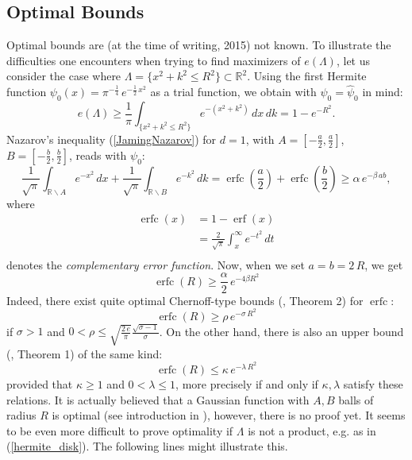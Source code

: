\documentclass[12pt,a4paper]{article}
\newcommand{\RR}[1]{\mathbb{R}^#1}
\begin{document}
\subsection{Optimal Bounds}
Optimal bounds are (at the time of writing, 2015) not known. To illustrate the
difficulties one encounters when trying to find maximizers of $e(\Lambda)$, let us
consider the case where $\Lambda=\{x^2+k^2\leq R^2\}\subset\RR{2}$. Using the first
Hermite function $\psi_0(x)=\pi^{-\frac{1}{4}}\,e^{-\frac{1}{2}\,x^2}$ as a trial
function, we obtain with $\psi_0=\hat\psi_0$ in mind:
\begin{equation}\label{hermite_disk}
   e(\Lambda) \geq \frac{1}{\pi}\int_{\{x^2+k^2\leq R^2\}} e^{-(x^2+k^2)}\, dx\,dk
   = 1-e^{-R^2}.
\end{equation}
Nazarov's inequality (\ref{JamingNazarov}) for $d=1$, with 
$A=[-\frac{a}{2},\frac{a}{2}]$, $B=[-\frac{b}{2},\frac{b}{2}]$, reads with $\psi_0$:
\begin{equation*}
    \frac{1}{\sqrt{\pi}} \int_{\mathbb{R}\backslash A} e^{-x^2}\,dx +
    \frac{1}{\sqrt{\pi}} \int_{\mathbb{R}\backslash B} e^{-k^2}\,dk =
    \operatorname{erfc}({\frac{a}{2}})+\operatorname{erfc}({\frac{b}{2}})
    \geq \alpha\,e^{-\beta\, a b},
\end{equation*}
where 
\begin{align*}
    \operatorname{erfc}(x) & = 1-\operatorname{erf}(x) \\[5pt]
                           & = \frac{2}{\sqrt\pi} \int_x^\infty e^{-t^2}\, dt \\[5pt]
\end{align*} 
denotes the {\sl complementary error function}. Now, when we set $a=b=2\,R$, we get
\begin{equation}
    \operatorname{erfc}(R) \geq \frac{\alpha}{2}\,e^{-4\beta R^2}
\end{equation}
Indeed, there exist quite optimal Chernoff-type bounds (\cite{Chang2011}, Theorem 2) for 
$\operatorname{erfc}$: 
\begin{equation}
   \operatorname{erfc}(R) \geq \rho\, e^{-\sigma\,R^2}
\end{equation}
if $\sigma > 1$ and $0<\rho\leq \sqrt{\frac{2\,e}{\pi}} \frac{\sqrt{\sigma-1}}{\sigma}$.
On the other hand, there is also an upper bound (\cite{Chang2011}, Theorem 1) of the
same kind:
\begin{equation}
   \operatorname{erfc}(R) \leq \kappa\, e^{-\lambda\,R^2}
\end{equation}
provided that $\kappa \geq 1$ and $0<\lambda\leq 1$, more precisely if and only if
$\kappa,\lambda$ satisfy these relations. It is actually believed that a Gaussian
function with $A,B$ balls of radius $R$ is optimal (see introduction in \cite{jaming:hal-00120268}), however, there is no proof yet. It seems to be even
more difficult to prove optimality if $\Lambda$ is not a product, e.g. as in
(\ref{hermite_disk}). The following lines might illustrate this. 
\end{document}

